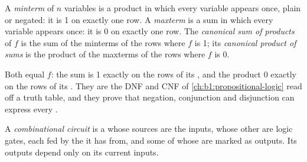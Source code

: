 
\begin{definition}\label{def:b1:combinational-circuits:canonical}
A \emph{minterm} of $n$ variables is a product in which every variable appears once, plain or negated: it
is 1 on exactly one row. A \emph{maxterm} is a sum in which every variable appears once: it is 0 on exactly
one row. The \emph{canonical sum of products} of $f$ is the sum of the minterms of the
rows where $f$ is 1; its \emph{canonical product of sums} is the product of the maxterms
of the rows where $f$ is 0.
\end{definition}

Both equal $f$: the sum is 1 exactly on the rows of its , and the product 0 exactly on the rows of its
. They are the DNF and CNF of \cref{ch:b1:propositional-logic} read off a truth table, and they prove that
negation, conjunction and disjunction can express every .

\label{lst:b1:combinational-circuits:canonical}

\label{out:b1:combinational-circuits:canonical}

\begin{definition}\label{def:b1:combinational-circuits:combinational}
A \emph{combinational circuit} is a  whose sources are the inputs,
whose other  are logic gates, each fed by the  it has  from, and some of whose  are marked as
outputs. Its outputs depend only on its current inputs.
\end{definition}

